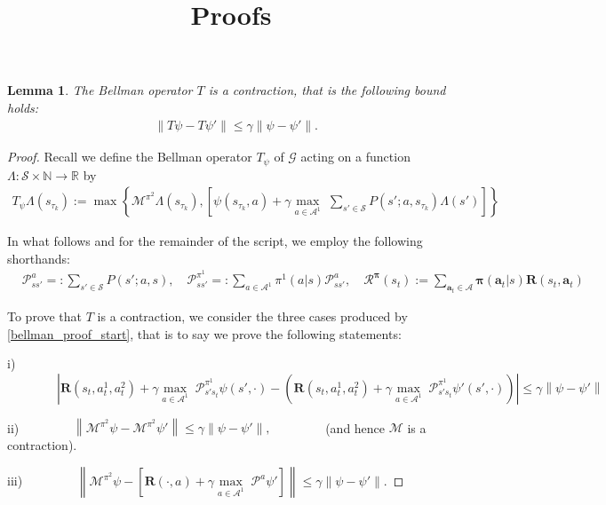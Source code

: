 \documentclass[12pt]{article}
\title{Proofs}
\author{}
\newtheorem{proof}{Proof}
\newtheorem{lemma}{Lemma}
\begin{document}
\date{}
\maketitle
\begin{lemma}\label{lemma:bellman_contraction}
The Bellman operator $T$ is a contraction, that is the following bound holds:
\begin{align*}
&\left\|T\psi-T\psi'\right\|\leq \gamma\left\|\psi-\psi'\right\|.
\end{align*}
\end{lemma}

\begin{proof}
Recall we define the Bellman operator $T_\psi$ of $\mathcal{G}$ acting on a function $\Lambda:\mathcal{S}\times\mathbb{N}\to\mathbb{R}$ by
% 
\begin{align}
T_\psi \Lambda(s_{\tau_k}):=\max\left\{\mathcal{M}^{\pi^2}\Lambda(s_{\tau_k}),\left[ \psi(s_{\tau_k},a)+\gamma\underset{a\in\mathcal{A}^1}{\max}\;\sum_{s'\in\mathcal{S}}P(s';a,s_{\tau_k})\Lambda(s')\right]\right\}\label{bellman_proof_start}
\end{align}

In what follows and for the remainder of the script, we employ the following shorthands:
\begin{align*}
&\mathcal{P}^a_{ss'}=:\sum_{s'\in\mathcal{S}}P(s';a,s), \quad\mathcal{P}^{\pi^1}_{ss'}=:\sum_{a\in\mathcal{A}^1}\pi^1(a|s)\mathcal{P}^a_{ss'}, \quad \mathcal{R}^{\boldsymbol{\pi}}(s_{t}):=\sum_{\boldsymbol{a}_t\in\boldsymbol{\mathcal{A}}}\boldsymbol{\pi}(\boldsymbol{a}_t|s)\boldsymbol{R}(s_t,\boldsymbol{a}_t)
\end{align*}

To prove that $T$ is a contraction, we consider the three cases produced by \eqref{bellman_proof_start}, that is to say we prove the following statements:

i) $\qquad\qquad
\left| \boldsymbol{R}(s_t,a^1_t,a^2_t)+\gamma\underset{a\in\mathcal{A}^1}{\max}\;\mathcal{P}^{\pi^1}_{s's_t}\psi(s',\cdot)-\left( \boldsymbol{R}(s_t,a^1_t,a^2_t)+\gamma\underset{a\in\mathcal{A}^1}{\max}\;\mathcal{P}^{\pi^1}_{s's_t}\psi'(s',\cdot)\right)\right|\leq \gamma\left\|\psi-\psi'\right\|$

ii) $\qquad\qquad
\left\|\mathcal{M}^{\pi^2}\psi-\mathcal{M}^{\pi^2}\psi'\right\|\leq    \gamma\left\|\psi-\psi'\right\|,\qquad \qquad$
  (and hence $\mathcal{M}$ is a contraction).

iii) $\qquad\qquad
    \left\|\mathcal{M}^{\pi^2}\psi-\left[ \boldsymbol{R}(\cdot,a)+\gamma\underset{a\in\mathcal{A}^1}{\max}\;\mathcal{P}^a\psi'\right]\right\|\leq \gamma\left\|\psi-\psi'\right\|.
$


\end{proof}
\end{document}
